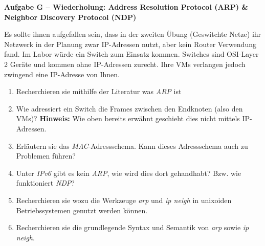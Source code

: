 \documentclass[paper=a4,fontsize=11pt]{scrartcl}%
\numberwithin{equation}{section}
\begin{document}
\begin{center}\Large{\textbf{Aufgabe G -- Wiederholung: Address Resolution Protocol (ARP) \& Neighbor Discovery Protocol (NDP)}}\end{center}\vskip0.25in
Es sollte ihnen aufgefallen sein, dass in der zweiten Übung (Geswitchte Netze) ihr Netzwerk in der Planung zwar IP-Adressen nutzt, aber kein Router Verwendung fand. Im Labor würde ein Switch zum Einsatz kommen. Switches sind OSI-Layer 2 Geräte und kommen ohne IP-Adressen zurecht. Ihre VMs verlangen jedoch zwingend eine IP-Adresse von Ihnen.
\begin{enumerate}
		\item Recherchieren sie mithilfe der Literatur was \emph{ARP} ist \cite[Kap. 5.4f]{Kurose2012}
		\item Wie adressiert ein Switch die Frames zwischen den Endknoten (also den VMs)? \textbf{Hinweis:} Wie oben bereits erwähnt geschieht dies nicht mittels IP-Adressen.
		\item Erläutern sie das \emph{MAC}-Adressschema. Kann dieses Adressschema auch zu Problemen führen?
		\item Unter \emph{IPv6} gibt es kein \emph{ARP}, wie wird dies dort gehandhabt? Bzw. wie funktioniert \emph{NDP}?
		\item Recherchieren sie wozu die Werkzeuge \emph{arp} und \emph{ip neigh} in unixoiden Betriebssystemen genutzt werden können.
		\item Recherchieren sie die grundlegende Syntax und Semantik von \emph{arp} sowie \emph{ip neigh}.
\end{enumerate}
\end{document}
